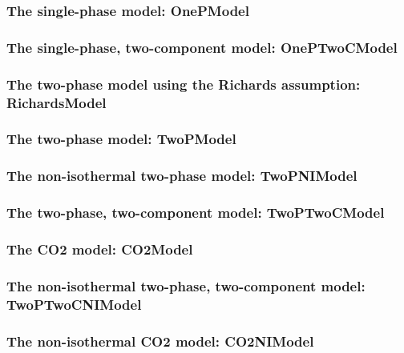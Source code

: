\subsubsection{The single-phase model: OnePModel} 


\subsubsection{The single-phase, two-component model:  OnePTwoCModel} 


\subsubsection{The two-phase model using the Richards assumption: RichardsModel} 


\subsubsection{The two-phase model: TwoPModel}


\subsubsection{The non-isothermal two-phase model: TwoPNIModel} 


\subsubsection{The two-phase, two-component model: TwoPTwoCModel} 


\subsubsection{The CO2 model: CO2Model} 


\subsubsection{The non-isothermal two-phase, two-component model: TwoPTwoCNIModel} 


\subsubsection{The non-isothermal CO2 model: CO2NIModel} 


